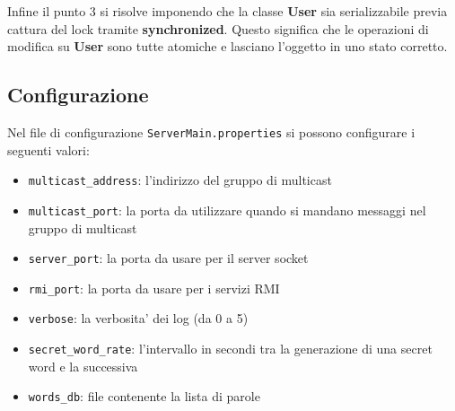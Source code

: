 Infine il punto 3 si risolve imponendo che la classe \textbf{User} sia serializzabile previa cattura del lock tramite \textbf{synchronized}. Questo significa che le operazioni di modifica su \textbf{User} sono tutte atomiche e lasciano l'oggetto in uno stato corretto.

\subsection{Configurazione}

Nel file di configurazione \texttt{ServerMain.properties} si possono configurare i seguenti valori:
\begin{itemize}
	\item \texttt{multicast\_address}: l'indirizzo del gruppo di multicast
	\item \texttt{multicast\_port}: la porta da utilizzare quando si mandano messaggi nel gruppo di multicast
	\item \texttt{server\_port}: la porta da usare per il server socket
	\item \texttt{rmi\_port}: la porta da usare per i servizi RMI
	\item \texttt{verbose}: la verbosita' dei log (da 0 a 5)
	\item \texttt{secret\_word\_rate}: l'intervallo in secondi tra la generazione di una secret word e la successiva
	\item \texttt{words\_db}: file contenente la lista di parole	
\end{itemize}